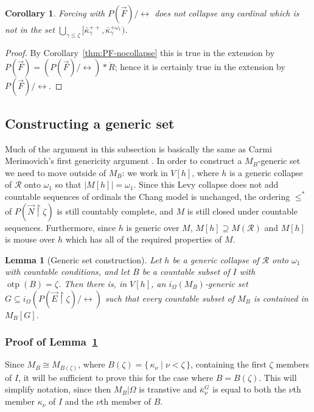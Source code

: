\documentclass[
twoside,
]{article}
\newtheorem{lemma}[theorem]{Lemma}
\newtheorem{corollary}[theorem]{Corollary}
\theoremstyle{definition}
\theoremstyle{remark}
\newcommand{\forceKappa}{\bar\kappa} %
\DeclareMathOperator{\otp}{otp}
\newcommand{\ords}{\Omega}
\newcommand\gkeq{\leftrightarrow}
\newcommand\mgkeq{/{\gkeq}}
\newcommand\reals{\mathcal{R}}
\newcommand{\cut}{{\vert}}
\newcommand{\set}[1]{\{\,#1\,\}}
\newcommand{\card}[1]{|#1|}
\newcommand{\restrict}{{\upharpoonright}}
\begin{document}
\begin{corollary}\label{thm:nocollapse-PFgkeq}
  Forcing with $P(\vec F)\mgkeq$ does not collapse any cardinal which is not in the set $\bigcup_{\gamma\leq\zeta}[\forceKappa_{\gamma}^{++},
  \forceKappa^{+\omega_1}_{\gamma})$.
\end{corollary}

\begin{proof}
  By Corollary~\ref{thm:PF-nocollapse}  this is true in the extension by $P(\vec F)=
  (P(\vec F)\mgkeq)*\dot R$; 
  hence it is certainly true in the extension by $P(\vec F)\mgkeq$.
\end{proof}

\subsection{Constructing a generic set}
\label{sec:generic_set}

Much of the argument in this subsection  is basically the same as
Carmi Merimovich's first genericity argument 
\cite[Theorem 5.1]{Merimovich2007Prikry-on-exten}.  
In order to construct a $M_B$-generic set we need to move outside of
$M_B$: we work in $V[h]$,  where $h$ is a generic collapse of
$\reals$ onto $\omega_1$ so that $\card{M[h]}=\omega_1$.   Since this Levy
collapse does not add countable sequences of ordinals  the Chang
model is unchanged, the ordering
$\le^*$ of $P(\vec 
N\restrict\zeta)$ is still countably complete, and  $M$ is still closed under
countable sequences.   Furthermore, since $h$ is generic over $M$,
$M[h]\supseteq M(\reals)$ and $M[h]$ is mouse over $h$ which has all
of the required
properties of $M$. 

\begin{lemma}[Generic set construction]\label{thm:generic_in_V_1}
  Let $h$ be a generic collapse of $\reals$ onto $\omega_1$ with
  countable conditions, and    
  let $B$ be a countable subset of $I$ with $\otp(B)=\zeta$. 
  Then there is, in $V[h]$,  an $i_{\ords}(M_B)$-generic set $G\subseteq
  i_{\ords}(P(\vec E\restrict\zeta)\mgkeq)$  such that
  every countable subset of $M_{B}$ is contained in $M_B[G]$.
\end{lemma}

\subsubsection{Proof of Lemma~\ref{thm:generic_in_V_1}}
\label{sec:generic_in_V_1_proof}
  Since $M_B\cong M_{B(\zeta)}$, where $B(\zeta)=\set{\kappa_\nu\mid
    \nu<\zeta}$,  containing the first $\zeta$ members of $I$, it will be
  sufficient to prove this for the case where $B=B(\zeta)$.
  This will simplify notation, since then $M_{B}\cut\ords$ is
  transtive and $\forceKappa_\nu^{G}$ is equal to both the $\nu$th
  member $\kappa_\nu$ of $I$ and the $\nu$th member of $B$.
\end{document}
